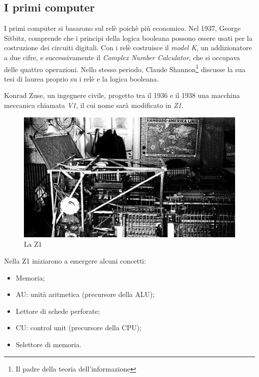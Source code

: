 \subsection{I primi computer}

I primi computer si basarono sul relè poichè più economico. Nel 1937, George Sitbitz, comprende che i principi della logica booleana possono essere usati per la costruzione dei circuiti digitali. Con i relè costruisce il \textit{model K}, un addizionatore a due cifre, e successivamente il \textit{Complex Number Calculator}, che si occupava delle quattro operazioni. Nello stesso periodo, Claude Shannon\footnote{Il padre della teoria dell'informazione} discusse la sua tesi di laurea proprio su i relè e la logica booleana. 

Konrad Zuse, un ingegnere civile, progetto tra il 1936 e il 1938 una macchina meccanica chiamata \textit{V1}, il cui nome sarà modificato in \textit{Z1}.

\begin{figure}
    \centering
    \includegraphics[scale = 0.5]{images/storia arch/Z1.png}
    \caption{La Z1}
    \label{fig:Z1}
\end{figure}

Nella Z1 iniziarono a emergere alcuni concetti:

\begin{itemize}
    \item Memoria;
    \item AU: unità aritmetica (precursore della ALU);
    \item Lettore di schede perforate;
    \item CU: control unit (precursore della CPU);
    \item Selettore di memoria.
\end{itemize}

